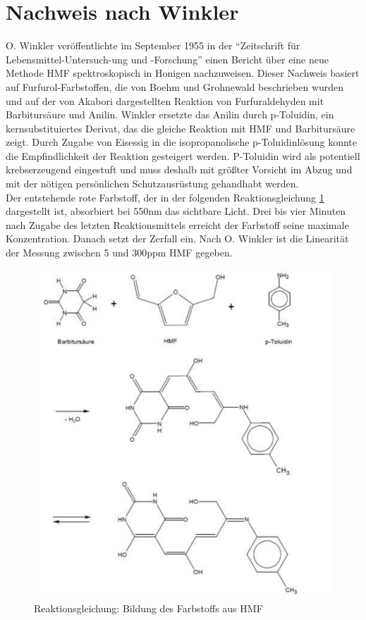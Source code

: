 \section{Nachweis nach Winkler}

O. Winkler veröffentlichte im September 1955 in der ``Zeitschrift für Lebensmittel-Untersuch-ung und -Forschung'' einen Bericht über eine neue Methode HMF spektroskopisch in Honigen nachzuweisen. Dieser Nachweis basiert auf Furfurol-Farbstoffen, die von Boehm und Grohnewald beschrieben wurden und auf der von Akabori dargestellten Reaktion von Furfuraldehyden mit Barbitursäure und Anilin. Winkler ersetzte das Anilin durch p-Toluidin, ein kernsubstituiertes Derivat, das die gleiche Reaktion mit HMF und Barbitursäure zeigt. Durch Zugabe von Eisessig in die isopropanolische p-Toluidinlösung konnte die Empfindlichkeit der Reaktion gesteigert werden. P-Toluidin wird als potentiell krebserzeugend eingestuft und muss deshalb mit größter Vorsicht im Abzug und mit der nötigen persönlichen Schutzausrüstung gehandhabt werden.\\
Der entstehende rote Farbstoff, der in der folgenden Reaktionsgleichung \ref{fig:Farbreaktionsgleichung2} dargestellt ist, absorbiert bei 550nm das sichtbare Licht. Drei bis vier Minuten nach Zugabe des letzten Reaktionsmittels erreicht der Farbstoff seine maximale Konzentration. Danach setzt der Zerfall ein. Nach O. Winkler ist die Linearität der Messung zwischen 5 und 300ppm HMF gegeben.~\cite{Winkler}

\begin{figure}[htbp]
	\centering
		\includegraphics[width=1.00\textwidth]{../Bilder/Farbreaktionsgleichung2.pdf}
	\caption{Reaktionsgleichung: Bildung des Farbstoffs aus HMF}
	\label{fig:Farbreaktionsgleichung2}
\end{figure}


